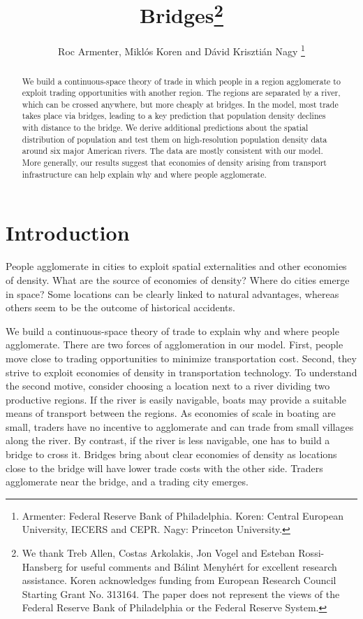 \documentclass[12pt]{article}
\begin{document}
\title{Bridges\thanks{%
We thank Treb Allen, Costas Arkolakis, Jon Vogel and Esteban Rossi-Hansberg for useful comments and B\'{a}lint Menyh\'{e}rt for excellent research assistance. Koren acknowledges funding from European Research Council Starting Grant No. 313164. The paper does not represent the views of the Federal Reserve Bank of Philadelphia or the Federal Reserve System.}}
\author{Roc Armenter, Mikl\'{o}s Koren and D\'{a}vid Kriszti\'{a}n Nagy%
\thanks{%
Armenter: Federal Reserve Bank of Philadelphia. Koren: Central European
University, IECERS and CEPR. Nagy: Princeton University.}}
\maketitle

\begin{abstract}
We build a continuous-space theory of trade in which people in a region
agglomerate to exploit trading opportunities with another region. The
regions are separated by a river, which can be crossed anywhere, but more
cheaply at bridges. In the model, most trade takes place via bridges,
leading to a key prediction that population density declines with distance
to the bridge. We derive additional predictions about the spatial
distribution of population and test them on high-resolution population
density data around six major American rivers. The data are mostly
consistent with our model. More generally, our results suggest that
economies of density arising from transport infrastructure can help explain
why and where people agglomerate.
\end{abstract}
\newpage
\section{Introduction}

People agglomerate in cities to exploit spatial externalities and other
economies of density. What are the source of economies of density? Where do
cities emerge in space? Some locations can be clearly linked to natural
advantages, whereas others seem to be the outcome of historical accidents.

We build a continuous-space theory of trade to explain why and where people
agglomerate. There are two forces of agglomeration in our model. First,
people move close to trading opportunities to minimize transportation cost.
Second, they strive to exploit economies of density in transportation
technology. To understand the second motive, consider choosing a location
next to a river dividing two productive regions. If the river is easily
navigable, boats may provide a suitable means of transport between the
regions. As economies of scale in boating are small, traders have no
incentive to agglomerate and can trade from small villages along the river.
By contrast, if the river is less navigable, one has to build a bridge to
cross it. Bridges bring about clear economies of density as locations close
to the bridge will have lower trade costs with the other side. Traders
agglomerate near the bridge, and a trading city emerges.
\end{document}
